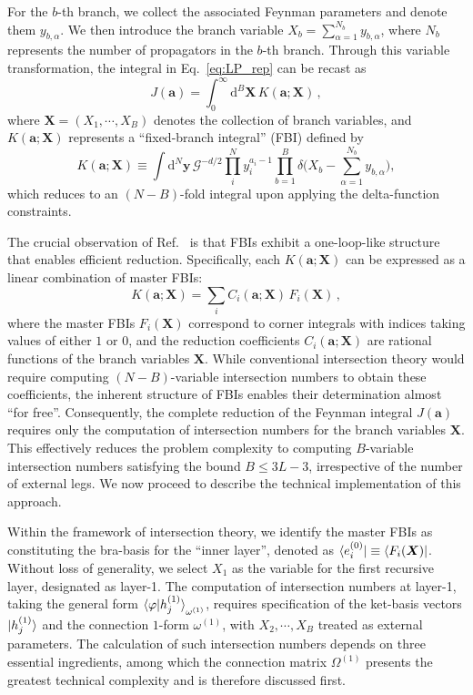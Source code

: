 \documentclass[reprint,superscriptaddress]{revtex4-2}
\newcommand{\w}{\omega}
\newcommand{\dif}{\mathrm{d}}
\begin{document}
For the $b$-th branch, we collect the associated Feynman parameters and denote them $y_{b,\alpha}$. We then introduce the branch variable $X_b = \sum_{\alpha=1}^{N_b} y_{b,\alpha}$, where $N_b$ represents the number of propagators in the $b$-th branch. Through this variable transformation, the integral in Eq.~\eqref{eq:LP_rep} can be recast as
\begin{equation}
    J(\bm{a}) = \int_0^\infty \dif^B \bm{X} \, K(\bm{a}; \bm{X}) \,,
\end{equation}
where $\bm{X} = (X_1,\cdots,X_B)$ denotes the collection of branch variables, and $K(\bm{a};\bm{X})$ represents a ``fixed-branch integral'' (FBI) defined by
\begin{equation}
    K(\bm{a};\bm{X}) \equiv \int \dif^N \bm{y} \, \mathcal{G}^{-d/2} \prod_i^N y_i^{a_i-1} \prod_{b=1}^B \delta \Big( X_b - \sum_{\alpha=1}^{N_b} y_{b,\alpha} \Big) ,
\end{equation} 
which reduces to an $(N-B)$-fold integral upon applying the delta-function constraints.

The crucial observation of Ref.~\cite{Huang:2024nij} is that FBIs exhibit a one-loop-like structure that enables efficient reduction. Specifically, each $K(\bm{a};\bm{X})$ can be expressed as a linear combination of master FBIs:
\begin{equation}
    K(\bm{a};\bm{X}) = \sum_i C_i(\bm{a};\bm{X}) \, F_i(\bm{X}) \,,
    \label{eq:reduction_FBI}
\end{equation}
where the master FBIs $F_i(\bm{X})$ correspond to corner integrals with indices taking values of either $1$ or $0$, and the reduction coefficients $C_i(\bm{a};\bm{X})$ are rational functions of the branch variables $\bm{X}$. While conventional intersection theory would require computing $(N-B)$-variable intersection numbers to obtain these coefficients, the inherent structure of FBIs enables their determination almost ``for free''. Consequently, the complete reduction of the Feynman integral $J(\bm{a})$ requires only the computation of intersection numbers for the branch variables $\bm{X}$. This effectively reduces the problem complexity to computing $B$-variable intersection numbers satisfying the bound $B \leq 3L-3$, irrespective of the number of external legs. We now proceed to describe the technical implementation of this approach.

Within the framework of intersection theory, we identify the master FBIs as constituting the bra-basis for the ``inner layer'', denoted as $\bra{e_i^{(0)}} \equiv \bra{F_i(\bm{X})}$. Without loss of generality, we select $X_1$ as the variable for the first recursive layer, designated as layer-1. The computation of intersection numbers at layer-1, taking the general form $\braket{\varphi | h_j^{(1)}}_{\w^{(1)}}$, requires specification of the ket-basis vectors $\ket{h_j^{(1)}}$ and the connection $1$-form $\w^{(1)}$, with $X_2,\cdots,X_B$ treated as external parameters. The calculation of such intersection numbers depends on three essential ingredients, among which the connection matrix $\Omega^{(1)}$ presents the greatest technical complexity and is therefore discussed first.
\end{document}
